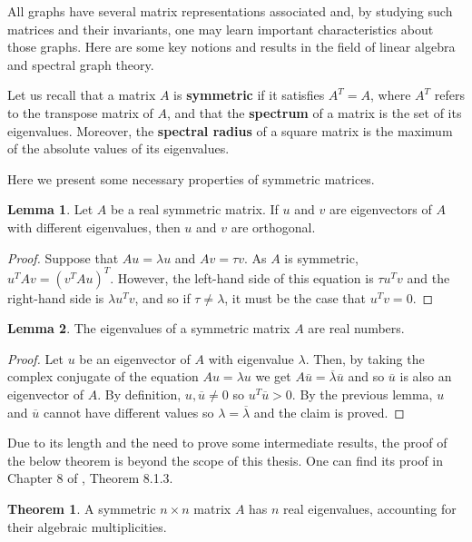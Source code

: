 \documentclass[11pt]{article}
\theoremstyle{definition}
\newtheorem{lemma}{Lemma}
\newtheorem{thm}{Theorem}
\begin{document}
All graphs have several matrix representations associated and, by studying such matrices and their invariants, one may learn important characteristics about those graphs. Here are some key notions and results in the field of linear algebra and spectral graph theory.

Let us recall that a matrix $A$ is \textbf{symmetric} if it satisfies $A^T = A$, where $A^T$ refers to the transpose matrix of $A$, and that the \textbf{spectrum} of a matrix is the set of its eigenvalues. Moreover, the \textbf{spectral radius} of a square matrix is the maximum of the absolute values of its eigenvalues.

Here we present some necessary properties of symmetric matrices.

\begin{lemma}
Let $A$ be a real symmetric matrix. If $u$ and $v$ are eigenvectors of $A$ with different eigenvalues, then $u$ and $v$ are orthogonal.
\end{lemma}

\begin{proof}
Suppose that $A u = \lambda u$ and $A v = \tau v$. As $A$ is symmetric, $u^T A v = (v^T A u)^T$. However, the left-hand side of this equation is $\tau u^T v$ and the right-hand side is $\lambda u^T v$, and so if $\tau \neq \lambda$, it must be the case that $u^T v = 0$.
\end{proof}

\begin{lemma}
The eigenvalues of a symmetric matrix $A$ are real numbers.
\end{lemma}

\begin{proof}
Let $u$ be an eigenvector of $A$ with eigenvalue $\lambda$. Then, by taking the complex conjugate of the equation $Au = \lambda u$ we get $A \overline{u} = \overline{\lambda} \overline{u}$ and so $\overline{u}$ is also an eigenvector of $A$. By definition, $u, \overline{u} \neq 0$ so $u^{T} \overline{u} > 0$. By the previous lemma, $u$ and $\overline{u}$ cannot have different values so $\lambda = \overline{\lambda}$ and the claim is proved. 
\end{proof}

Due to its length and the need to prove some intermediate results, the proof of the below theorem is beyond the scope of this thesis. One can find its proof in Chapter 8 of \cite{Bretscher}, Theorem 8.1.3.

\begin{thm} \label{spectral theorem consequence}
A symmetric $n \times n$ matrix $A$ has $n$ real eigenvalues, accounting for their algebraic multiplicities.
\end{thm}
\end{document}
